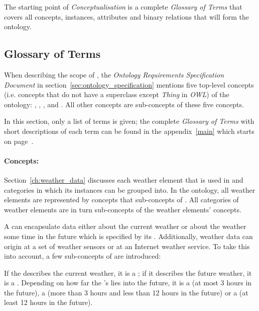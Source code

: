 The starting point of \emph{Conceptualisation} is a complete \emph{Glossary of Terms} that covers all concepts, instances, attributes and binary relations that will form the ontology.

\subsection{Glossary of Terms}
\label{sec:ontology_glossary}

When describing the scope of \thinkhomeweather, the \emph{Ontology Requirements Specification Document} in section~\ref{sec:ontology_specification} mentions five top-level concepts (i.e. concepts that do not have a superclass except \emph{Thing} in \emph{OWL}) of the ontology: , , , and . All other concepts are sub-concepts of these five concepts.

In this section, only a list of terms is given; the complete \emph{Glossary of Terms} with short descriptions of each term can be found in the appendix~\ref{main} which starts on page~\pageref{main}.

\paragraph{Concepts:}

Section~\ref{ch:weather_data} discusses each weather element that is used in \thinkhomeweather and categories in which its instances can be grouped into. In the ontology, all weather elements are represented by concepts that sub-concepts of . All categories of weather elements are in turn sub-concepts of the weather elements' concepts.

A  can encapsulate data either about the current weather or about the weather some time in the future which is specified by its . Additionally, weather data can origin at a set of weather sensors or at an Internet weather service. To take this into account, a few sub-concepts of  are introduced:

If the  describes the current weather, it is a ; if it describes the future weather, it is a . Depending on how far the 's  lies into the future, it is a  (at most 3 hours in the future), a  (more than 3 hours and less than 12 hours in the future) or a  (at least 12 hours in the future). %

